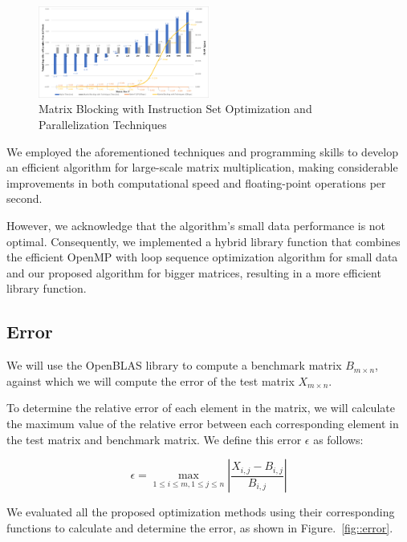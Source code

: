 \documentclass[conference]{IEEEtran}
\begin{document}
	\begin{figure}[htbp]
		\centerline{\includegraphics[width=0.5\textwidth]{fig9.png}}
		\caption{Matrix Blocking with Instruction Set Optimization and Parallelization Techniques}
		\label{fig::matrixfinal}
	\end{figure}

	We employed the aforementioned techniques and programming skills to develop an efficient algorithm for large-scale matrix multiplication, making considerable improvements in both computational speed and floating-point operations per second.
	
	However, we acknowledge that the algorithm's small data performance is not optimal. Consequently, we implemented a hybrid library function that combines the efficient OpenMP with loop sequence optimization algorithm for small data and our proposed algorithm for bigger matrices, resulting in a more efficient library function.
	
	\subsection{Error}
	
	We will use the OpenBLAS library to compute a benchmark matrix $B_{m \times n}$, against which we will compute the error of the test matrix $X_{m \times n}$.
	
	To determine the relative error of each element in the matrix, we will calculate the maximum value of the relative error between each corresponding element in the test matrix and benchmark matrix. We define this error $\epsilon$ as follows: 
	
	\begin{equation}
		\epsilon = \max\limits_{1 \leq i \leq m, 1 \leq j \leq n} \left| \frac{X_{i,j} - B_{i,j}}{B_{i,j}} \right |
	\end{equation}
	
	
	
	We evaluated all the proposed optimization methods using their corresponding functions to calculate and determine the error, as shown in Figure.~\ref{fig::error}.
\end{document}
